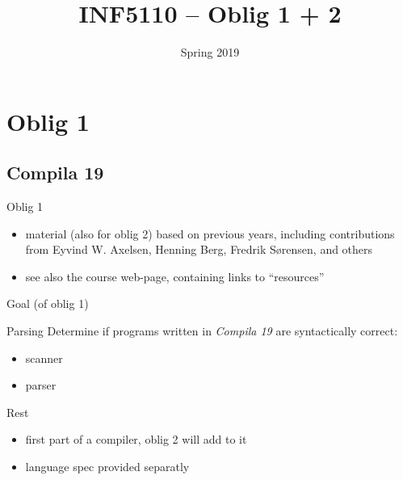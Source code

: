 \documentclass{beamer}
\date{Spring 2019}
\title{INF5110 -- Oblig 1 + 2}
\renewcommand{\maketitle}{}
\begin{document}
\maketitle
\section{Oblig 1}
\label{sec:orgc60b42f}



\subsection{Compila 19}
\label{sec:orga73d465}

\begin{frame}[label={sec:org33bd579}]{Oblig 1}
\begin{itemize}
\item material (also for oblig 2) based on previous years, including contributions from Eyvind
W. Axelsen, Henning Berg, Fredrik Sørensen, and others
\end{itemize}


\begin{itemize}
\item see also the course web-page, containing links to ``resources''
\end{itemize}
\end{frame}


\begin{frame}[label={sec:orgf46450f}]{Goal (of oblig 1)}
\begin{block}{Parsing}
Determine if programs written in \emph{Compila 19} are syntactically correct: 

\begin{itemize}
\item scanner
\item parser
\end{itemize}
\end{block}


\begin{block}{Rest}
\begin{itemize}
\item first part of a compiler, oblig 2 will add to it
\item language spec provided separatly
\end{itemize}
\end{block}
\end{frame}
\end{document}
